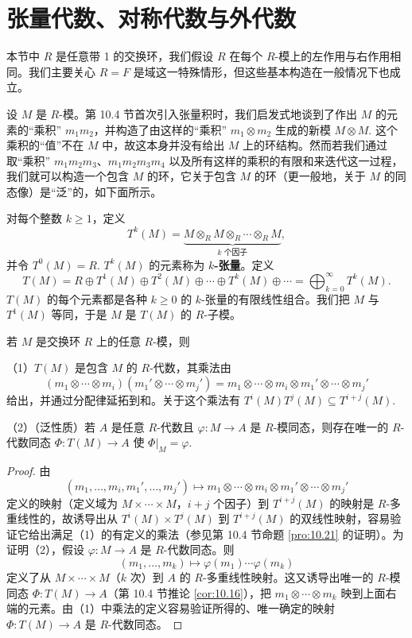 \section{张量代数、对称代数与外代数}

本节中 \(R\) 是任意带 1 的交换环，我们假设 \(R\) 在每个 \(R\)-模上的左作用与右作用相同。我们主要关心 \(R = F\) 是域这一特殊情形，但这些基本构造在一般情况下也成立。

设 \(M\) 是 \(R\)-模。第 10.4 节首次引入张量积时，我们启发式地谈到了作出 \(M\) 的元素的“乘积” \(m_1m_2\)，并构造了由这样的“乘积” \(m_1 \otimes m_2\) 生成的新模 \(M \otimes M\). 这个乘积的“值”不在 \(M\) 中，故这本身并没有给出 \(M\) 上的环结构。然而若我们通过取“乘积” \(m_1m_2m_3\)、\(m_1m_2m_3m_4\) 以及所有这样的乘积的有限和来迭代这一过程，我们就可以构造一个包含 \(M\) 的环，它关于包含 \(M\) 的环（更一般地，关于 \(M\) 的同态像）是“泛”的，如下面所示。

对每个整数 \(k \geq 1\)，定义
\[
T^k(M) = \underbrace{M \otimes_R M \otimes_R \cdots \otimes_R M}_{k \text{ 个因子}},
\]
并令 \(T^0(M) = R\). \(T^k(M)\) 的元素称为 \textbf{\(k\)-张量}。定义
\[
T(M) = R \oplus T^1(M) \oplus T^2(M) \oplus \cdots \oplus T^k(M) \oplus \cdots = \bigoplus_{k=0}^{\infty} T^k(M).
\]
\(T(M)\) 的每个元素都是各种 \(k \geq 0\) 的 \(k\)-张量的有限线性组合。我们把 \(M\) 与 \(T^1(M)\) 等同，于是 \(M\) 是 \(T(M)\) 的 \(R\)-子模。

\begin{theorem}\label{thm:11.31}
若 \(M\) 是交换环 \(R\) 上的任意 \(R\)-模，则

（1）\(T(M)\) 是包含 \(M\) 的 \(R\)-代数，其乘法由
\[
(m_1 \otimes \cdots \otimes m_i)(m_1' \otimes \cdots \otimes m_j') = m_1 \otimes \cdots \otimes m_i \otimes m_1' \otimes \cdots \otimes m_j'
\]
给出，并通过分配律延拓到和。关于这个乘法有 \(T^i(M)T^j(M) \subseteq T^{i+j}(M)\).

（2）（泛性质）若 \(A\) 是任意 \(R\)-代数且 \(\varphi : M \to A\) 是 \(R\)-模同态，则存在唯一的 \(R\)-代数同态 \(\Phi : T(M) \to A\) 使 \(\Phi|_M = \varphi\).
\end{theorem}

\begin{proof}
由
\[
(m_1, \ldots, m_i, m_1', \ldots, m_j') \longmapsto m_1 \otimes \cdots \otimes m_i \otimes m_1' \otimes \cdots \otimes m_j'
\]
定义的映射（定义域为 \(M \times \cdots \times M\)，\(i+j\) 个因子）到 \(T^{i+j}(M)\) 的映射是 \(R\)-多重线性的，故诱导出从 \(T^i(M) \times T^j(M)\) 到 \(T^{i+j}(M)\) 的双线性映射，容易验证它给出满足（1）的有定义的乘法（参见第 10.4 节命题 \ref{pro:10.21} 的证明）。为证明（2），假设 \(\varphi : M \to A\) 是 \(R\)-代数同态。则
\[
(m_1, \ldots, m_k) \longmapsto \varphi(m_1)\cdots\varphi(m_k)
\]
定义了从 \(M \times \cdots \times M\)（\(k\) 次）到 \(A\) 的 \(R\)-多重线性映射。这又诱导出唯一的 \(R\)-模同态 \(\Phi : T(M) \to A\)（第 10.4 节推论 \ref{cor:10.16}），把 \(m_1 \otimes \cdots \otimes m_k\) 映到上面右端的元素。由（1）中乘法的定义容易验证所得的、唯一确定的映射 \(\Phi : T(M) \to A\) 是 \(R\)-代数同态。
\end{proof}

